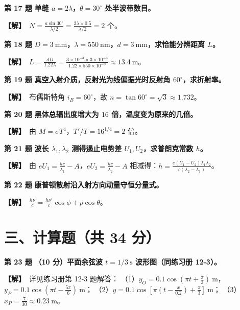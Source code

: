 \documentclass[zihao=5,a4paper,UTF8]{ctexart}
\newenvironment{prob}[2]{%
    \par\vspace{5pt}\noindent\textbf{\color{navy}#1} \textbf{#2}\par\nopagebreak\vspace{2pt}%
}{%
    \par\vspace{3pt}%
}
\newcommand{\sol}{\noindent\textbf{\color{tealaccent}【解】}\ }
\begin{document}
\begin{prob}{第 17 题}{单缝 $a=2\lambda$，$\theta=30^\circ$ 处半波带数目。}
\sol $N = \frac{a\sin 30^\circ}{\lambda/2} = \frac{2\lambda\times 0.5}{\lambda/2} = 2$ 个。
\end{prob}

\begin{prob}{第 18 题}{$D=3\ \mathrm{mm}$，$\lambda=550\ \mathrm{nm}$，$d=3\ \mathrm{mm}$，求恰能分辨距离 $L$。}
\sol $L = \frac{dD}{1.22\lambda} = \frac{3\times 10^{-3}\times 3\times 10^{-3}}{1.22\times 550\times 10^{-9}} \approx 13.4\ \mathrm{m}$。
\end{prob}

\begin{prob}{第 19 题}{真空入射介质，反射光为线偏振光时反射角 $60^\circ$，求折射率。}
\sol 布儒斯特角 $i_B = 60^\circ$，故 $n = \tan 60^\circ = \sqrt{3} \approx 1.732$。
\end{prob}

\begin{prob}{第 20 题}{黑体总辐出度增大为 $16$ 倍，温度变为原来的几倍。}
\sol 由 $M = \sigma T^4$，$T'/T = 16^{1/4} = 2$ 倍。
\end{prob}

\begin{prob}{第 21 题}{波长 $\lambda_1, \lambda_2$ 测得遏止电势差 $U_1, U_2$，求普朗克常数 $h$。}
\sol 由 $eU_1 = \frac{hc}{\lambda_1} - A$，$eU_2 = \frac{hc}{\lambda_2} - A$ 相减得：$h = \frac{e(U_1 - U_2)\lambda_1\lambda_2}{c(\lambda_2 - \lambda_1)}$。
\end{prob}

\begin{prob}{第 22 题}{康普顿散射沿入射方向动量守恒分量式。}
\sol $\frac{h\nu}{c} = \frac{h\nu'}{c}\cos\phi + p\cos\theta$。
\end{prob}

\section*{三、计算题（共 34 分）}

\begin{prob}{第 23 题}{（10 分）平面余弦波 $t=1/3\ \mathrm{s}$ 波形图（同练习册 12-3）。}
\sol 详见练习册第 12-3 题解答：
（1）$y_O = 0.1\cos\left(\pi t + \frac{\pi}{3}\right)\ \mathrm{m}$，$y_P = 0.1\cos\left(\pi t - \frac{5\pi}{6}\right)\ \mathrm{m}$；
（2）$y = 0.1\cos\left[\pi\left(t - \frac{x}{0.2}\right) + \frac{\pi}{3}\right]\ \mathrm{m}$；
（3）$x_P = \frac{7}{30} \approx 0.23\ \mathrm{m}$。
\end{prob}
\end{document}
